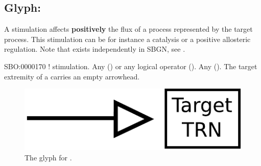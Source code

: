 
\subsection{Glyph: }\label{sec:stimulation}

A stimulation affects \textbf{positively} the flux of a process represented by the target process. This stimulation can be for instance a catalysis or a positive allosteric regulation. Note that  exists independently in SBGN, see .

\begin{glyphDescription}
 \glyphSboTerm SBO:0000170 ! stimulation.
 \glyphOrigin Any  () or any logical operator ().
 \glyphTarget Any  ().
 \glyphEndPoint The target extremity of a  carries an empty arrowhead.
 \end{glyphDescription}

\begin{figure}[H]
  \centering
  \includegraphics[scale = 0.5]{images/stimulation}
  \caption{The \PD glyph for .}
  \label{fig:stimulation}
\end{figure}


